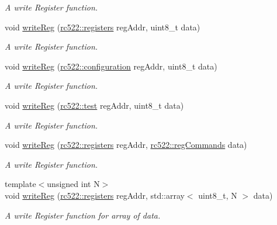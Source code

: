 \begin{DoxyCompactItemize}
\begin{DoxyCompactList}\small\item\em A write Register function. \end{DoxyCompactList}\item 
void \hyperlink{classrc522_aa8e748a997e22ef74e00c05f8d8383c5}{write\+Reg} (\hyperlink{classrc522_a83057db5f8fefa3dc9a6e8e5f0e191ee}{rc522\+::registers} reg\+Addr, uint8\+\_\+t data)
\begin{DoxyCompactList}\small\item\em A write Register function. \end{DoxyCompactList}\item 
void \hyperlink{classrc522_a51979eca697dcfeddf2ef8795adf7851}{write\+Reg} (\hyperlink{classrc522_afcf27c8198d017cd4e8173c7d7a6fded}{rc522\+::configuration} reg\+Addr, uint8\+\_\+t data)
\begin{DoxyCompactList}\small\item\em A write Register function. \end{DoxyCompactList}\item 
void \hyperlink{classrc522_a6907bf656f821a89e636a1b8cf28fe60}{write\+Reg} (\hyperlink{classrc522_a9589917c9bbcd18ea9c7d86c7ec565bd}{rc522\+::test} reg\+Addr, uint8\+\_\+t data)
\begin{DoxyCompactList}\small\item\em A write Register function. \end{DoxyCompactList}\item 
void \hyperlink{classrc522_a458e303b33f57ed839c21e790f912191}{write\+Reg} (\hyperlink{classrc522_a83057db5f8fefa3dc9a6e8e5f0e191ee}{rc522\+::registers} reg\+Addr, \hyperlink{classrc522_a3a205976fb9b7265bc5b7971215fbb7c}{rc522\+::reg\+Commands} data)
\begin{DoxyCompactList}\small\item\em A write Register function. \end{DoxyCompactList}\item 
{\footnotesize template$<$unsigned int N$>$ }\\void \hyperlink{classrc522_adce878aa570ff9f611df399139229265}{write\+Reg} (\hyperlink{classrc522_a83057db5f8fefa3dc9a6e8e5f0e191ee}{rc522\+::registers} reg\+Addr, std\+::array$<$ uint8\+\_\+t, N $>$ data)
\begin{DoxyCompactList}\small\item\em A write Register function for array of data. \end{DoxyCompactList}\item 

\end{DoxyCompactItemize}
